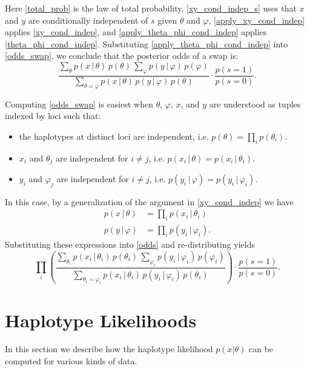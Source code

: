 \documentclass[12pt]{article}
\begin{document}
Here \eqref{total_prob} is the law of total probability, \eqref{xy_cond_indep_s} uses that $x$ and $y$ are conditionally independent of $s$ given $\theta$ and $\varphi$, \eqref{apply_xy_cond_indep} applies \eqref{xy_cond_indep}, and \eqref{apply_theta_phi_cond_indep} applies \eqref{theta_phi_cond_indep}.  Substituting \eqref{apply_theta_phi_cond_indep} into \eqref{odds_swap}, we conclude that the posterior odds of a swap is:
\begin{equation}
\label{odds}
\boxed{\frac{\sum_\theta p(x \, | \, \theta) \, p(\theta) \, \sum_{\varphi} p(y \, | \, \varphi) \, p(\varphi)}{\sum_{\theta = \varphi} p(x \, | \, \theta) \, p(y \, | \, \varphi) \, p(\theta)} \cdot \frac{p(s=1)}{p(s=0)}.}
\end{equation}

Computing \eqref{odds_swap} is easiest when $\theta$, $\varphi$, $x$, and $y$ are understood as tuples indexed by loci such that:
\begin{itemize}
\item the haplotypes at distinct loci are independent, i.e. $p(\theta) = \prod_i p(\theta_i)$.
\item $x_i$ and $\theta_j$ are independent for $i \neq j$, i.e. $p(x_i \, | \, \theta) = p(x_i \, | \, \theta_i)$.
\item $y_i$ and $\varphi_j$ are independent for $i \neq j$, i.e. $p(y_i \, | \, \varphi) = p(y_i \, | \, \varphi_i)$.
\end{itemize}
In this case, by a generalization of the argument in \eqref{xy_cond_indep} we have
\begin{align*}
p(x \, | \, \theta) &= \textstyle\prod\limits_i p(x_i \, | \, \theta_i) \\
p(y \, | \, \varphi) &= \textstyle\prod\limits_i p(y_i \, | \, \varphi_i).
\end{align*}
Substituting these expressions into \eqref{odds} and re-distributing yields
\begin{equation*}
\boxed{\prod_i \left(\frac{\sum_{\theta_i} p(x_i \, | \, \theta_i) \, p(\theta_i) \, \sum_{\varphi_i} p(y_i \, | \, \varphi_i) \, p(\varphi_i)}{\sum_{\theta_i = \varphi_i} p(x_i \, | \, \theta_i) \, p(y_i \, | \, \varphi_i) \, p(\theta_i)}\right) \cdot \frac{p(s=1)}{p(s=0)}.}
\end{equation*}

\section{Haplotype Likelihoods}
In this section we describe how the haplotype likelihood $p(x|\theta)$ can be computed for various kinds of data.
\end{document}
